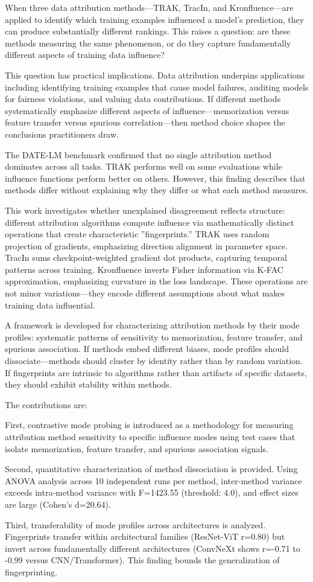 
When three data attribution methods---TRAK, TracIn, and Kronfluence---are applied to identify which training examples influenced a model's prediction, they can produce substantially different rankings. This raises a question: are these methods measuring the same phenomenon, or do they capture fundamentally different aspects of training data influence?

This question has practical implications. Data attribution underpins applications including identifying training examples that cause model failures, auditing models for fairness violations, and valuing data contributions. If different methods systematically emphasize different aspects of influence---memorization versus feature transfer versus spurious correlation---then method choice shapes the conclusions practitioners draw.

The DATE-LM benchmark \citep{jiao2025datelm} confirmed that no single attribution method dominates across all tasks. TRAK performs well on some evaluations while influence functions perform better on others. However, this finding describes that methods differ without explaining why they differ or what each method measures.

This work investigates whether unexplained disagreement reflects structure: different attribution algorithms compute influence via mathematically distinct operations that create characteristic ''fingerprints.'' TRAK uses random projection of gradients, emphasizing direction alignment in parameter space. TracIn sums checkpoint-weighted gradient dot products, capturing temporal patterns across training. Kronfluence inverts Fisher information via K-FAC approximation, emphasizing curvature in the loss landscape. These operations are not minor variations---they encode different assumptions about what makes training data influential.

A framework is developed for characterizing attribution methods by their mode profiles: systematic patterns of sensitivity to memorization, feature transfer, and spurious association. If methods embed different biases, mode profiles should dissociate---methods should cluster by identity rather than by random variation. If fingerprints are intrinsic to algorithms rather than artifacts of specific datasets, they should exhibit stability within methods.

The contributions are:

First, contrastive mode probing is introduced as a methodology for measuring attribution method sensitivity to specific influence modes using test cases that isolate memorization, feature transfer, and spurious association signals.

Second, quantitative characterization of method dissociation is provided. Using ANOVA analysis across 10 independent runs per method, inter-method variance exceeds intra-method variance with F=1423.55 (threshold: 4.0), and effect sizes are large (Cohen's d=20.64).

Third, transferability of mode profiles across architectures is analyzed. Fingerprints transfer within architectural families (ResNet-ViT r=0.80) but invert across fundamentally different architectures (ConvNeXt shows r=-0.71 to -0.99 versus CNN/Transformer). This finding bounds the generalization of fingerprinting.
